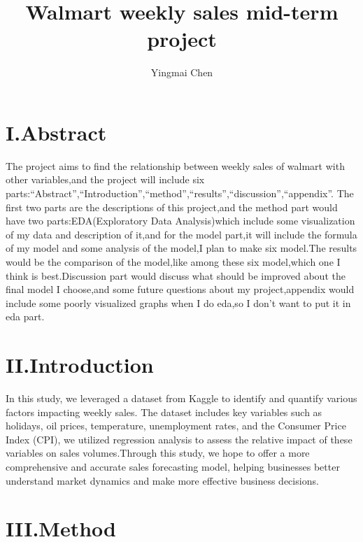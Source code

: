 \documentclass[
  letterpaper,
  DIV=11,
  numbers=noendperiod]{scrartcl}
\title{Walmart weekly sales mid-term project}
\author{Yingmai Chen}
\date{}
\begin{document}
\maketitle
\ifdefined\Shaded\renewenvironment{Shaded}{\begin{tcolorbox}[sharp corners, breakable, borderline west={3pt}{0pt}{shadecolor}, boxrule=0pt, enhanced, interior hidden, frame hidden]}{\end{tcolorbox}}\fi

\hypertarget{i.abstract}{%
\section{I.Abstract}\label{i.abstract}}

The project aims to find the relationship between weekly sales of
walmart with other variables,and the project will include six
parts:``Abstract'',``Introduction'',``method'',``results'',``discussion'',``appendix''.
The first two parts are the descriptions of this project,and the method
part would have two parts:EDA(Exploratory Data Analysis)which include
some visualization of my data and description of it,and for the model
part,it will include the formula of my model and some analysis of the
model,I plan to make six model.The results would be the comparison of
the model,like among these six model,which one I think is
best.Discussion part would discuss what should be improved about the
final model I choose,and some future questions about my project,appendix
would include some poorly visualized graphs when I do eda,so I don't
want to put it in eda part.

\hypertarget{ii.introduction}{%
\section{II.Introduction}\label{ii.introduction}}

In this study, we leveraged a dataset from Kaggle to identify and
quantify various factors impacting weekly sales. The dataset includes
key variables such as holidays, oil prices, temperature, unemployment
rates, and the Consumer Price Index (CPI), we utilized regression
analysis to assess the relative impact of these variables on sales
volumes.Through this study, we hope to offer a more comprehensive and
accurate sales forecasting model, helping businesses better understand
market dynamics and make more effective business decisions.

\hypertarget{iii.method}{%
\section{III.Method}\label{iii.method}}
\end{document}
